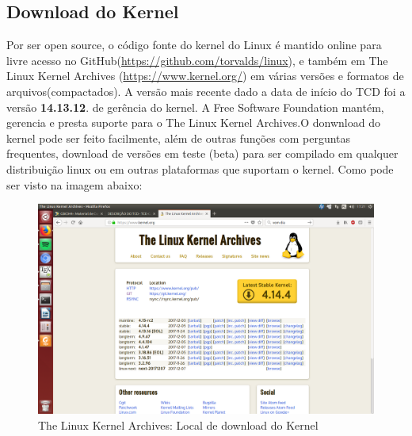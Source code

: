 \documentclass[12pt]{article}
\begin{document}
\subsection*{Download do Kernel}
Por ser open source, o código fonte do kernel do Linux é mantido online para livre acesso no GitHub(\url{https://github.com/torvalds/linux}), e também em The Linux Kernel Archives (\url{https://www.kernel.org/}) em várias versões e formatos de arquivos(compactados). A versão mais recente dado a data de início do TCD foi a versão \textbf{14.13.12}.
de gerência do kernel.
	A Free Software Foundation mantém, gerencia e presta suporte para o The Linux Kernel Archives.O donwnload do kernel pode ser feito facilmente, além de outras funções com perguntas frequentes, download de versões em teste (beta) para ser compilado em qualquer distribuição linux ou em outras plataformas que suportam o kernel.
	\vspace*{2cm}
	 Como pode ser visto na imagem abaixo:
\begin{figure}[!h]
	\centering
	\includegraphics[scale=0.2]{imagens/kernelorg.png}
	\caption{The Linux Kernel Archives: Local de download do Kernel}
	\label{kernelorg}
\end{figure}
\end{document}
